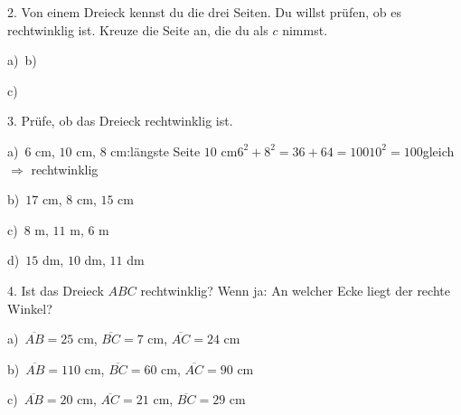 \documentclass[11pt]{article}
\newcommand{\grau}[1]{{\color{mbgrau}#1}}
\begin{document}
\begin{pfaufg}{}{2.}{}
Von einem Dreieck kennst du die drei Seiten. Du willst prüfen, ob es rechtwinklig ist. Kreuze die Seite an, die du als $c$ nimmst.\par\smallskip a)\ \hspace{2em}b)\ \par\smallskip c)\ \par
{}
\end{pfaufg}

\begin{pfaufg}{}{3.}{}
Prüfe, ob das Dreieck rechtwinklig ist.\par\medskip
\grau{a)\ $6$ cm, $10$ cm, $8$ cm:\quad längste Seite $10$ cm\quad $6^2 + 8^2 = 36 + 64 = 100$\quad $10^2 = 100$\quad gleich $\Rightarrow$ rechtwinklig}\par\medskip
\noindent\begin{minipage}[t]{0.48\linewidth}
b)\ $17$ cm, $8$ cm, $15$ cm
\end{minipage}\hfill
\begin{minipage}[t]{0.48\linewidth}
c)\ $8$ m, $11$ m, $6$ m
\end{minipage}
\noindent\begin{minipage}[t]{0.48\linewidth}
d)\ $15$ dm, $10$ dm, $11$ dm
\end{minipage}
\end{pfaufg}

\begin{pfaufg}{}{4.}{}
Ist das Dreieck $ABC$ rechtwinklig? Wenn ja: An welcher Ecke liegt der rechte Winkel?\par\smallskip
\noindent\begin{minipage}[t]{0.48\linewidth}
a)\ $\overline{AB} = 25$ cm, $\overline{BC} = 7$ cm, $\overline{AC} = 24$ cm
\end{minipage}\hfill
\begin{minipage}[t]{0.48\linewidth}
b)\ $\overline{AB} = 110$ cm, $\overline{BC} = 60$ cm, $\overline{AC} = 90$ cm
\end{minipage}
\noindent\begin{minipage}[t]{0.48\linewidth}
c)\ $\overline{AB} = 20$ cm, $\overline{AC} = 21$ cm, $\overline{BC} = 29$ cm
\end{minipage}
\end{pfaufg}
\end{document}
